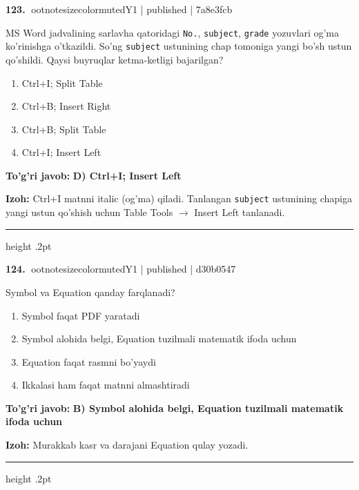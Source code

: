 \documentclass[10pt,a4paper]{article}
\begin{document}
\textbf{\color{ink}123.} {ootnotesizecolor{muted}Y1 | published | 7a8e3fcb}
\par
MS Word jadvalining sarlavha qatoridagi \texttt{No.}, \texttt{subject}, \texttt{grade} yozuvlari og'ma ko'rinishga o'tkazildi. So'ng \texttt{subject} ustunining chap tomoniga yangi bo'sh ustun qo'shildi. Qaysi buyruqlar ketma-ketligi bajarilgan?
\begin{enumerate}[label=\Alph*),leftmargin=9mm]
\item Ctrl+I; Split Table
\item Ctrl+B; Insert Right
\item Ctrl+B; Split Table
\item Ctrl+I; Insert Left
\end{enumerate}
\begin{tcolorbox}[enhanced,breakable,colback=teal!4,colframe=teal!55!black,boxrule=0.45pt,arc=1.2mm,left=2.8mm,right=2.8mm,top=2mm,bottom=2mm]
\textbf{\color{teal}To'g'ri javob:} \textbf{D) Ctrl+I; Insert Left}
\par\smallskip
\textbf{Izoh:} Ctrl+I matnni italic (og'ma) qiladi. Tanlangan \texttt{subject} ustunining chapiga yangi ustun qo'shish uchun Table Tools \ensuremath{\rightarrow} Insert Left tanlanadi.
\end{tcolorbox}
\vspace{2mm}\hrule height .2pt\vspace{2mm}

\textbf{\color{ink}124.} {ootnotesizecolor{muted}Y1 | published | d30b0547}
\par
Symbol va Equation qanday farqlanadi?
\begin{enumerate}[label=\Alph*),leftmargin=9mm]
\item Symbol faqat PDF yaratadi
\item Symbol alohida belgi, Equation tuzilmali matematik ifoda uchun
\item Equation faqat rasmni bo'yaydi
\item Ikkalasi ham faqat matnni almashtiradi
\end{enumerate}
\begin{tcolorbox}[enhanced,breakable,colback=teal!4,colframe=teal!55!black,boxrule=0.45pt,arc=1.2mm,left=2.8mm,right=2.8mm,top=2mm,bottom=2mm]
\textbf{\color{teal}To'g'ri javob:} \textbf{B) Symbol alohida belgi, Equation tuzilmali matematik ifoda uchun}
\par\smallskip
\textbf{Izoh:} Murakkab kasr va darajani Equation qulay yozadi.
\end{tcolorbox}
\vspace{2mm}\hrule height .2pt\vspace{2mm}
\end{document}
